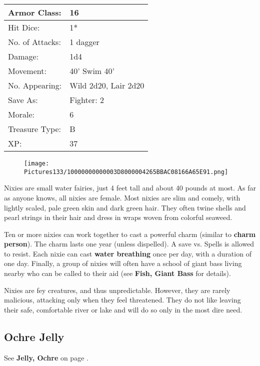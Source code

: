 \documentclass[a4paper,twoside,openany,10pt]{book}
\begin{document}
\begin{multicols}{2}
\begin{tabularx}{0.50\textwidth}{@{}lX@{}}
Armor Class: & 16 \\\hline
Hit Dice: & 1* \\\hline
No. of Attacks: & 1 dagger \\\hline
Damage: & 1d4 \\\hline
Movement: & 40' Swim 40' \\\hline
No. Appearing: & Wild 2d20, Lair 2d20 \\\hline
Save As: & Fighter: 2 \\\hline
Morale: & 6 \\\hline
Treasure Type: & B \\\hline
XP: & 37 \\\hline
\end{tabularx}\medskip

\begin{wrapfigure}{l}{0.25\textwidth}
	\texttt{[image: Pictures133/10000000000003D8000004265BBAC08166A65E91.png]}
\end{wrapfigure}

Nixies are small water fairies, just 4 feet tall and about 40 pounds at most. As far as anyone knows, all nixies are female. Most nixies are slim and comely, with lightly scaled, pale green skin and dark green hair. They often twine shells and pearl strings in their hair and dress in wraps woven from colorful seaweed.

Ten or more nixies can work together to cast a powerful charm (similar to \textbf{charm person}). The charm lasts one year (unless dispelled). A save vs. Spells is allowed to resist. Each nixie can cast \textbf{water breathing }once per day, with a duration of one day. Finally, a group of nixies will often have a school of giant bass living nearby who can be called to their aid (see \textbf{Fish, Giant Bass} for details).

Nixies are fey creatures, and thus unpredictable. However, they are rarely malicious, attacking only when they feel threatened. They do not like leaving their safe, comfortable river or lake and will do so only in the most dire need.

\subsection*{Ochre Jelly}\label{ochre-jelly}

See \textbf{Jelly, Ochre }on page
\hyperlink{jelly-ochre}{\pageref{jelly-ochre}}.


\end{multicols}
\end{document}

